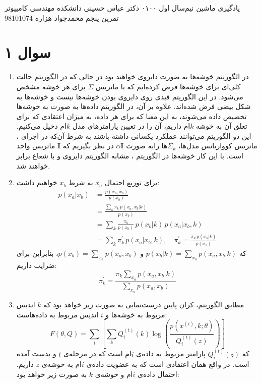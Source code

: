 \documentclass[a4paper, 12pt]{article}
\begin{document}
\handout
{یادگیری ماشین}
{نیم‌سال اول ۰۱\lr{-}۰۰}
{دکتر عباس حسینی}
{دانشکده مهندسی کامپیوتر}
{تمرین پنجم}
{محمد‌جواد هزاره}
{98101074}
\noindent
\\ [-6em]
\section*{سوال ۱}
\begin{enumerate}
	\item
	در الگوریتم
	خوشه‌ها به صورت دایروی خواهند بود در حالی که در الگوریتم 
	حالت کلی‌ای برای خوشه‌ها فرض کرده‌ایم که با ماتریس $\Sigma$ برای هر خوشه مشخص می‌شود. در این الگوریتم قیدی روی دایروی بودن خوشه‌ها نیست و خوشه‌ها به شکل بیضی فرض شده‌اند. علاوه بر آن، در الگوریتم  داده‌ها به صورت  به خوشه‌ها تخصیص داده می‌شوند، به این معنا که برای هر داده، به میزان اعتقادی که برای تعلق آن به خوشه $k$ام داریم، آن را در تعیین پارامترهای مدل $k$ام دخیل می‌کنیم. این دو الگوریتم می‌توانند عملکرد یکسانی داشته باشند به شرط آن‌که در اجرای 
	، ماتریس کوواریانس مدل‌ها، $\Sigma_k$ها رابه صورت $\alpha\bm{I}$ در نظر بگیریم که $\bm{I}$ ماتریس واحد است. با این کار خوشه‌ها در الگوریتم
	، مشابه الگوریتم  دایروی و با شعاع برابر خواهند شد.
	\item
	برای توزیع احتمال $x_a$ به شرط $x_b$ خواهیم داشت:
	\[
	\begin{aligned}
		p(x_a|x_b) &= \frac{p(x_a, x_b)}{p(x_b)} \\[0.5em]
		&= \frac{\sum_k \pi_k \, p(x_a, x_b|k)}{p(x_b)} \\[0.5em]
		&= \sum_k \frac{\pi_k}{p(x_b)}\,p(x_b|k)\,p(x_a|x_b, k) \\[0.5em]
		&= \sum_k \pi^\prime_k \, p(x_a | x_b, k), \quad \pi^\prime_k = \frac{\pi_k\,p(x_b|k)}{p(x_b)}
	\end{aligned}
	\]
	که 
	$p(x_b|k) = \sum_{x_a}p(x_a,x_b|k)$
	و
	$p(x_b) = \sum_{x_a} p(x_a, x_b)$،
	بنابراین برای ضرایب داریم:
	\[
	\boxed{\pi^\prime_k = \frac{\pi_k\sum_{x_a}p(x_a, x_b|k)}{\sum_{x_a}p(x_a, x_b)}}
	\]
	\item
	مطابق الگوریتم، کران پایین درست‌نمایی به صورت زیر خواهد بود که $k$ اندیس مربوط به خوشه‌ها و $i$ اندیس مربوط به داده‌هاست:
	\[
	F(\theta, Q) = \sum_i \left[\sum_k Q_i^{(t)}(k) \log\left(\frac{p(x^{(i)}, k; \theta)}{Q_i^{(t)}(z)}\right)\right]
	\]
	که
	$Q_i^{(t)}(z)$
	پارامتر مربوط به داده‌ی $i$ام است که در مرحله‌ی $t$ و  بدست آمده است. در واقع همان اعتقادی است که به عضویت داده‌ی $i$ام به خوشه‌ی $z$ داریم. احتمال داده‌ی $i$ام و خوشه‌ی $k$ به صورت زیر خواهد بود:

\end{enumerate}
\end{document}
